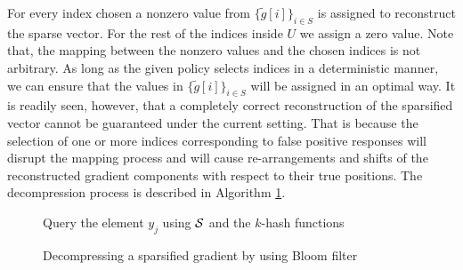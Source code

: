         For every index chosen a nonzero value from $\{\tilde{g}[i]\}_{i\in S}$ is assigned to reconstruct the sparse vector. For the rest of the indices inside $U$ we assign a zero value. Note that, the mapping between the nonzero values and the chosen indices is not arbitrary. As long as the given policy selects indices in a deterministic manner, we can ensure that the values in $\{\tilde{g}[i]\}_{i\in S}$ will be assigned in an optimal way. It is readily seen, however, that a completely correct reconstruction of the sparsified vector cannot be guaranteed under the current setting. That is because the selection of one or more indices corresponding to false positive responses will disrupt the mapping process and will cause re-arrangements and shifts of the reconstructed gradient components with respect to their true positions. The decompression process is described in Algorithm \ref{alg_3:decompress_BF}.
        
        \begin{figure}
        \begin{minipage}{1\textwidth}
        \centering
        \begin{algorithm}[H]
        	\SetAlgoLined
        \nl{}
         \nl {}
            {\nl Query the element $y_j$ using ${\cal S}$ and the $k$-hash functions\;
            \nl {}
        		    {\;
        		}
         	}
           \;
            \nl {}
            {\;
         	}
         	\nl {}
            {\;
         	}
         	\caption{Decompressing a sparsified gradient by using Bloom filter} \label{alg_3:decompress_BF}
         \end{algorithm}
        \end{minipage}
        \end{figure}
    

